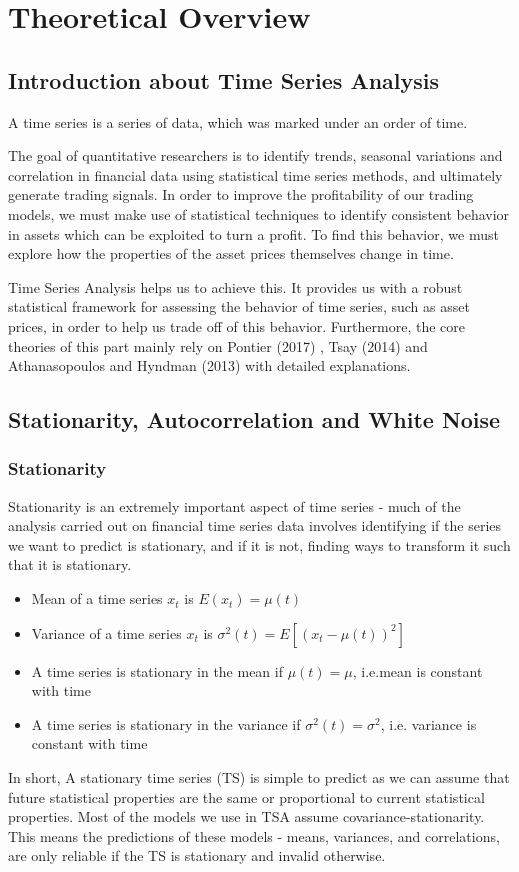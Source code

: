 \section{Theoretical Overview}
\label{sec:Theoretical}
\subsection {Introduction about Time Series Analysis}
A time series is a series of data, which was marked under an order of time.

The goal of quantitative researchers is to identify trends, seasonal variations and correlation in financial data using statistical time series methods, and ultimately generate trading signals. In order to improve the profitability of our trading models, we must make use of statistical techniques to identify consistent behavior in assets which can be exploited to turn a profit. To find this behavior, we must explore how the properties of the asset prices themselves change in time.

Time Series Analysis helps us to achieve this. It provides us with a robust statistical framework for assessing the behavior of time series, such as asset prices, in order to help us trade off of this behavior. Furthermore, the core theories of this part mainly rely on Pontier (2017) \cite{MPontier}, Tsay (2014) \cite{tsa2012} and Athanasopoulos and Hyndman (2013) \cite{hyndman2014forecasting} with detailed explanations. 

\subsection {Stationarity, Autocorrelation and White Noise}
		\subsubsection{Stationarity}  
Stationarity is an extremely important aspect of time series - much of the analysis carried out on financial time series data involves identifying if the series we want to predict is stationary, and if it is not, finding ways to transform it such that it is stationary. 
          \begin{itemize}
          \item  Mean of a time series $x_t$ is $E(x_t)=\mu(t)$
          \item  Variance of a time series $x_t$ is $\sigma^2(t)=E[(x_t - \mu(t))^2]$ 
          \item  A time series is stationary in the mean if $\mu(t)=\mu$, i.e.mean is constant with time
          \item  A time series is stationary in the variance if $\sigma^2(t)=\sigma^2$, i.e. variance is constant with time
         \end{itemize}
In short, A stationary time series (TS) is simple to predict as we can assume that future statistical properties are the same or proportional to current statistical properties. Most of the models we use in TSA assume covariance-stationarity. This means the predictions of these models - means, variances, and correlations, are only reliable if the TS is stationary and invalid otherwise.

